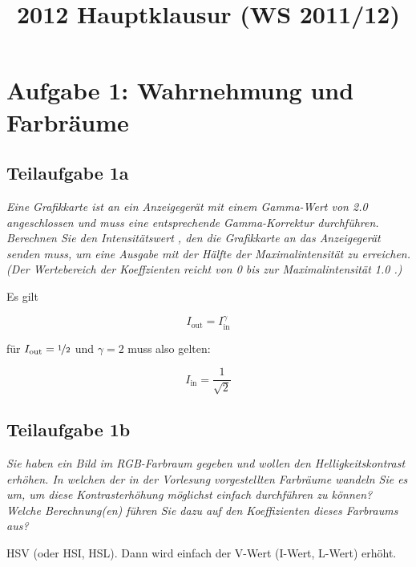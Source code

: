 \documentclass[a4paper]{scrartcl}
\begin{document}
\title{2012 Hauptklausur (WS 2011/12)}

\setcounter{section}{1}
\section*{Aufgabe 1: Wahrnehmung und Farbräume}
\subsection*{Teilaufgabe 1a}
\textit{Eine Grafikkarte ist an ein Anzeigegerät mit einem Gamma-Wert von 2.0 angeschlossen
und muss eine entsprechende Gamma-Korrektur durchführen.
Berechnen Sie den Intensitätswert , den die Grafikkarte an das Anzeigegerät senden muss, um eine Ausgabe
mit der Hälfte der Maximalintensität zu erreichen. (Der Wertebereich der Koeffzienten
reicht von 0 bis zur Maximalintensität 1.0 .)}

Es gilt

\[I_{\text{out}} = I_{\text{in}}^\gamma\]

für $I_{\text{out}} = \nicefrac{1}{2}$ und $\gamma = 2$ muss also gelten:

\[I_{\text{in}} = \frac{1}{\sqrt{2}}\]


\subsection*{Teilaufgabe 1b}
\textit{Sie haben ein Bild im RGB-Farbraum gegeben und wollen den Helligkeitskontrast erhöhen. In welchen der in der Vorlesung vorgestellten Farbräume wandeln Sie es um,
um diese Kontrasterhöhung möglichst einfach durchführen zu können? Welche Berechnung(en) führen Sie dazu auf den Koeffizienten dieses Farbraums aus?}

HSV (oder HSI, HSL). Dann wird einfach der V-Wert (I-Wert, L-Wert) erhöht.
\end{document}
